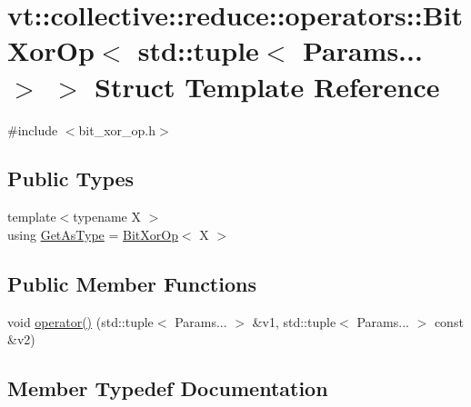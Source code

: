 \hypertarget{structvt_1_1collective_1_1reduce_1_1operators_1_1_bit_xor_op_3_01std_1_1tuple_3_01_params_8_8_8_01_4_01_4}{}\section{vt\+:\+:collective\+:\+:reduce\+:\+:operators\+:\+:Bit\+Xor\+Op$<$ std\+:\+:tuple$<$ Params... $>$ $>$ Struct Template Reference}
\label{structvt_1_1collective_1_1reduce_1_1operators_1_1_bit_xor_op_3_01std_1_1tuple_3_01_params_8_8_8_01_4_01_4}


{\ttfamily \#include $<$bit\+\_\+xor\+\_\+op.\+h$>$}

\subsection*{Public Types}
\begin{DoxyCompactItemize}
\item 
{\footnotesize template$<$typename X $>$ }\\using \hyperlink{structvt_1_1collective_1_1reduce_1_1operators_1_1_bit_xor_op_3_01std_1_1tuple_3_01_params_8_8_8_01_4_01_4_ac87adfaac6d907dea649b1a035dc6cb3}{Get\+As\+Type} = \hyperlink{structvt_1_1collective_1_1reduce_1_1operators_1_1_bit_xor_op}{Bit\+Xor\+Op}$<$ X $>$
\end{DoxyCompactItemize}
\subsection*{Public Member Functions}
\begin{DoxyCompactItemize}
\item 
void \hyperlink{structvt_1_1collective_1_1reduce_1_1operators_1_1_bit_xor_op_3_01std_1_1tuple_3_01_params_8_8_8_01_4_01_4_adce36dc07b6e947db92573ff47dfd412}{operator()} (std\+::tuple$<$ Params... $>$ \&v1, std\+::tuple$<$ Params... $>$ const \&v2)
\end{DoxyCompactItemize}


\subsection{Member Typedef Documentation}
\mbox{\label{structvt_1_1collective_1_1reduce_1_1operators_1_1_bit_xor_op_3_01std_1_1tuple_3_01_params_8_8_8_01_4_01_4_ac87adfaac6d907dea649b1a035dc6cb3}} 
